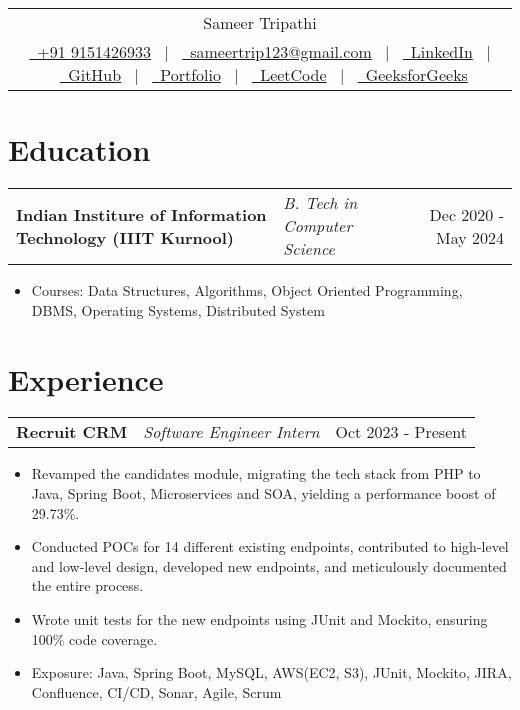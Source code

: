 \documentclass[a4paper,10pt]{article}
\makeatletter
\newenvironment{joblong}[3]
    {
    \begin{tabularx}{\linewidth}{@{}l X r@{}}
    \textbf{#1} & \textit{#2} &  #3 \\[3pt]
    \end{tabularx}
    \begin{minipage}[t]{\linewidth}
    \begin{itemize}[nosep,after=\strut, leftmargin=1em, itemsep=2pt,label=--]
    }
    {
    \end{itemize}
    \end{minipage}    
    }
\makeatother
\begin{document}
\pagestyle{empty} 


\begin{tabularx}{\linewidth}{@{} C @{}}
\Huge{Sameer Tripathi} \\[8pt]
\href{tel:+919151426933}{\ +91 9151426933} \ $|$ \
\href{mailto:sameertrip123@gmail.com}{\ sameertrip123@gmail.com} \ $|$ \
\href{https://linkedin.com/in/sameertri039}{\ LinkedIn} \ $|$ \ 
\href{https://github.com/sameertrip123}{\ GitHub} \ $|$ \ 
\href{https://sameertrip123.github.io/portfolio/}{\ Portfolio}  \ $|$ \ 
\href{https://leetcode.com/u/sameertri039/}{\ LeetCode} \ $|$ \
\href{https://www.geeksforgeeks.org/user/sameertri039/}{\ GeeksforGeeks}  \\
\end{tabularx}


\section{Education}
\vspace{-4pt}
\begin{joblong}{Indian Institure of Information Technology (IIIT Kurnool)}{B. Tech in Computer Science}{Dec 2020 - May 2024}
    \item Courses: Data Structures, Algorithms, Object Oriented Programming, DBMS, Operating Systems, Distributed System
\end{joblong}
\vspace{-16pt}

\section{Experience}
\vspace{-4pt}
\begin{joblong}{Recruit CRM}{Software Engineer Intern}{Oct 2023 - Present}
    \item Revamped the candidates module, migrating the tech stack from PHP to Java, Spring Boot, Microservices and SOA, yielding a performance boost of 29.73\%.
    \item Conducted POCs for 14 different existing endpoints, contributed to high-level and low-level design, developed new endpoints, and meticulously documented the entire process.
    \item Wrote unit tests for the new endpoints using JUnit and Mockito, ensuring 100\% code coverage.
    \item Exposure: Java, Spring Boot, MySQL, AWS(EC2, S3), JUnit, Mockito, JIRA, Confluence, CI/CD, Sonar, Agile, Scrum
\end{joblong}
\end{document}
